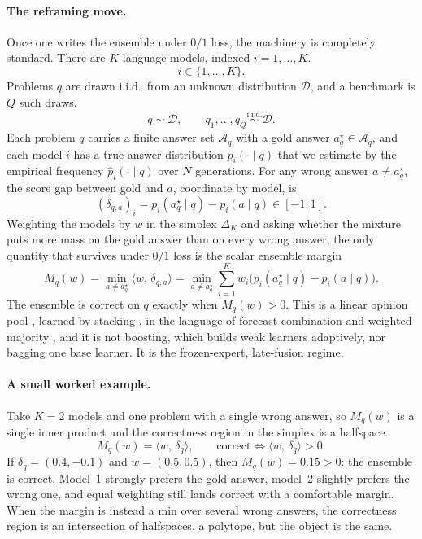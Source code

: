 \documentclass{article} %
\providecommand{\D}{\mathcal{D}}
\providecommand{\Aq}{\mathcal{A}_q}
\providecommand{\simplex}{\Delta_K}
\providecommand{\ip}[2]{\langle #1,\, #2\rangle}
\providecommand{\phat}{\widehat{p}}
\begin{document}
\paragraph{The reframing move.}
Once one writes the ensemble under $0/1$ loss, the machinery is completely
standard. There are $K$ language models, indexed $i=1,\dots,K$.
\begin{equation}
\label{eq:intro-K}
i \in \{1,\dots,K\}.
\end{equation}
Problems $q$ are drawn i.i.d.\ from an unknown distribution $\D$, and a benchmark
is $Q$ such draws.
\begin{equation}
\label{eq:intro-Q}
q \sim \D, \qquad q_1,\dots,q_Q \overset{\text{i.i.d.}}{\sim} \D.
\end{equation}
Each problem $q$ carries a finite answer set $\Aq$ with a gold answer
$a_q^\star \in \Aq$, and each model $i$ has a true answer distribution
$p_i(\cdot\mid q)$ that we estimate by the empirical frequency $\phat_i(\cdot\mid q)$
over $N$ generations. For any wrong answer $a\ne a_q^\star$, the score gap between
gold and $a$, coordinate by model, is
\begin{equation}
\label{eq:intro-delta}
(\delta_{q,a})_i = p_i(a_q^\star\mid q) - p_i(a\mid q) \in [-1,1].
\end{equation}
Weighting the models by $w$ in the simplex $\simplex$ and asking whether the
mixture puts more mass on the gold answer than on every wrong answer, the only
quantity that survives under $0/1$ loss is the scalar ensemble margin
\begin{equation}
\label{eq:intro-margin}
M_q(w) = \min_{a\ne a_q^\star} \ip{w}{\delta_{q,a}}
        = \min_{a\ne a_q^\star} \sum_{i=1}^K w_i\big(p_i(a_q^\star\mid q)-p_i(a\mid q)\big).
\end{equation}
The ensemble is correct on $q$ exactly when $M_q(w)>0$. This is a linear opinion
pool \citep{stone1961opinionpool,genest1986combining}, learned by stacking
\citep{wolpert1992stacked,breiman1996stacked}, in the language of forecast
combination \citep{bates1969combination} and weighted majority
\citep{littlestone1994weighted}, and it is not boosting, which builds weak
learners adaptively, nor bagging one base learner. It is the frozen-expert,
late-fusion regime.

\paragraph{A small worked example.}
Take $K=2$ models and one problem with a single wrong answer, so $M_q(w)$ is a
single inner product and the correctness region in the simplex is a halfspace.
\begin{equation}
\label{eq:intro-K2}
M_q(w) = \ip{w}{\delta_q}, \qquad \text{correct} \iff \ip{w}{\delta_q}>0.
\end{equation}
If $\delta_q = (0.4,-0.1)$ and $w=(0.5,0.5)$, then $M_q(w)=0.15>0$: the ensemble
is correct. Model~1 strongly prefers the gold answer, model~2 slightly prefers
the wrong one, and equal weighting still lands correct with a comfortable margin.
When the margin is instead a min over several wrong answers, the correctness
region is an intersection of halfspaces, a polytope, but the object is the same.
\end{document}
